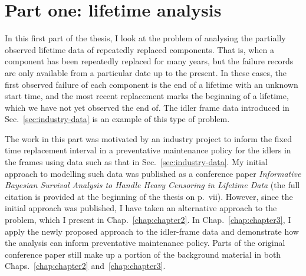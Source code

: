 \documentclass[apa,colorlinks,emptypage]{curtinThesis}
\begin{document}
\createtitlepage %

\plagiarismstatement %

\showthesisquote %



















\part{Part one: lifetime analysis}\label{part:one}

In this first part of the thesis, I look at the problem of analysing the partially observed lifetime data of repeatedly replaced components. That is, when a component has been repeatedly replaced for many years, but the failure records are only available from a particular date up to the present. In these cases, the first observed failure of each component is the end of a lifetime with an unknown start time, and the most recent replacement marks the beginning of a lifetime, which we have not yet observed the end of. The idler frame data introduced in Sec.~\ref{sec:industry-data} is an example of this type of problem.

The work in this part was motivated by an industry project to inform the fixed time replacement interval in a preventative maintenance policy for the idlers in the frames using data such as that in Sec.~\ref{sec:industry-data}. My initial approach to modelling such data was published as a conference paper \textit{Informative Bayesian Survival Analysis to Handle Heavy Censoring in Lifetime Data} (the full citation is provided at the beginning of the thesis on p.~vii). However, since the initial approach was published, I have taken an alternative approach to the problem, which I present in Chap.~\ref{chap:chapter2}. In Chap.~\ref{chap:chapter3}, I apply the newly proposed approach to the idler-frame data and demonstrate how the analysis can inform preventative maintenance policy. Parts of the original conference paper still make up a portion of the background material in both Chaps.~\ref{chap:chapter2} and~\ref{chap:chapter3}.
\end{document}
